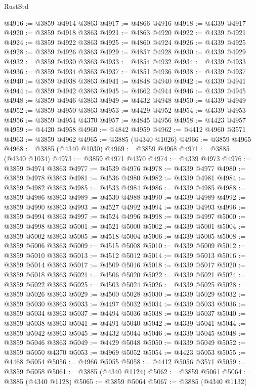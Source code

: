 \begin{lexlean}{RustStd}
\begin{coremodule}
@4916 := @3859 @4914 @3863
@4917 := @4866 @4916
@4918 := @4339 @4917
@4920 := @3859 @4918 @3863
@4921 := @4863 @4920
@4922 := @4339 @4921
@4924 := @3859 @4922 @3863
@4925 := @4860 @4924
@4926 := @4339 @4925
@4928 := @3859 @4926 @3863
@4929 := @4857 @4928
@4930 := @4339 @4929
@4932 := @3859 @4930 @3863
@4933 := @4854 @4932
@4934 := @4339 @4933
@4936 := @3859 @4934 @3863
@4937 := @4851 @4936
@4938 := @4339 @4937
@4940 := @3859 @4938 @3863
@4941 := @4848 @4940
@4942 := @4339 @4941
@4944 := @3859 @4942 @3863
@4945 := @4662 @4944
@4946 := @4339 @4945
@4948 := @3859 @4946 @3863
@4949 := @4432 @4948
@4950 := @4339 @4949
@4952 := @3859 @4950 @3863
@4953 := @4429 @4952
@4954 := @4339 @4953
@4956 := @3859 @4954 @4370
@4957 := @4845 @4956
@4958 := @4423 @4957
@4959 := @4420 @4958
@4960 := @4842 @4959
@4962 := @4412 @4960 @3571
@4963 := @3859 @4962
@4965 := @3885 (@4340 @1026)
@4966 := @3859 @4965
@4968 := @3885 (@4340 @1030)
@4969 := @3859 @4968
@4971 := @3885 (@4340 @1034)
@4973 := @3859 @4971 @4370
@4974 := @4339 @4973
@4976 := @3859 @4974 @3863
@4977 := @4539 @4976
@4978 := @4339 @4977
@4980 := @3859 @4978 @3863
@4981 := @4536 @4980
@4982 := @4339 @4981
@4984 := @3859 @4982 @3863
@4985 := @4533 @4984
@4986 := @4339 @4985
@4988 := @3859 @4986 @3863
@4989 := @4530 @4988
@4990 := @4339 @4989
@4992 := @3859 @4990 @3863
@4993 := @4527 @4992
@4994 := @4339 @4993
@4996 := @3859 @4994 @3863
@4997 := @4524 @4996
@4998 := @4339 @4997
@5000 := @3859 @4998 @3863
@5001 := @4521 @5000
@5002 := @4339 @5001
@5004 := @3859 @5002 @3863
@5005 := @4518 @5004
@5006 := @4339 @5005
@5008 := @3859 @5006 @3863
@5009 := @4515 @5008
@5010 := @4339 @5009
@5012 := @3859 @5010 @3863
@5013 := @4512 @5012
@5014 := @4339 @5013
@5016 := @3859 @5014 @3863
@5017 := @4509 @5016
@5018 := @4339 @5017
@5020 := @3859 @5018 @3863
@5021 := @4506 @5020
@5022 := @4339 @5021
@5024 := @3859 @5022 @3863
@5025 := @4503 @5024
@5026 := @4339 @5025
@5028 := @3859 @5026 @3863
@5029 := @4500 @5028
@5030 := @4339 @5029
@5032 := @3859 @5030 @3863
@5033 := @4497 @5032
@5034 := @4339 @5033
@5036 := @3859 @5034 @3863
@5037 := @4494 @5036
@5038 := @4339 @5037
@5040 := @3859 @5038 @3863
@5041 := @4491 @5040
@5042 := @4339 @5041
@5044 := @3859 @5042 @3863
@5045 := @4432 @5044
@5046 := @4339 @5045
@5048 := @3859 @5046 @3863
@5049 := @4429 @5048
@5050 := @4339 @5049
@5052 := @3859 @5050 @4370
@5053 := @4969 @5052
@5054 := @4423 @5053
@5055 := @4468 @5054
@5056 := @4966 @5055
@5058 := @4412 @5056 @3571
@5059 := @3859 @5058
@5061 := @3885 (@4340 @1124)
@5062 := @3859 @5061
@5064 := @3885 (@4340 @1128)
@5065 := @3859 @5064
@5067 := @3885 (@4340 @1132)

\end{coremodule}
\end{lexlean}
